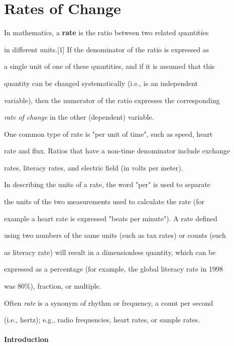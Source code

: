 \section{Rates of Change}
\label{sec:rates-of-change}

In mathematics, a \textbf{rate} is the ratio between two related quantities

in different units.[1] If the denominator of the ratio is expressed as

a single unit of one of these quantities, and if it is assumed that this

quantity can be changed systematically (i.e., is an independent

variable), then the numerator of the ratio expresses the corresponding

\textit{rate of change} in the other (dependent) variable.



One common type of rate is "per unit of time", such as speed, heart

rate and flux. Ratios that have a non-time denominator include exchange

rates, literacy rates, and electric field (in volts per meter).



In describing the units of a rate, the word "per" is used to separate

the units of the two measurements used to calculate the rate (for

example a heart rate is expressed "beats per minute"). A rate defined

using two numbers of the same units (such as tax rates) or counts (such

as literacy rate) will result in a dimensionless quantity, which can be

expressed as a percentage (for example, the global literacy rate in 1998

was 80\%), fraction, or multiple.



Often \textit{rate} is a synonym of rhythm or frequency, a count per second

(i.e., hertz); e.g., radio frequencies, heart rates, or sample rates.



\paragraph{Introduction}



